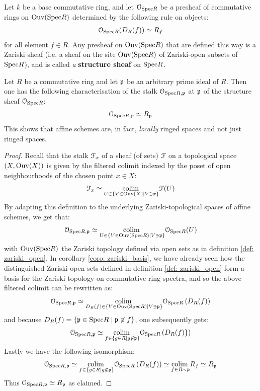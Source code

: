             \begin{proposition} \label{prop: structure_sheaf} 
                Let $k$ be a base commutative ring, and let $\mathcal{O}_{\mathrm{Spec} R}$ be \textit{a} presheaf of commutative rings on $\mathrm{Ouv}(\mathrm{Spec} R)$ determined by the following rule on objects:
                    $$\mathcal{O}_{\mathrm{Spec} R}(D_R(f)) \simeq R_f$$
                for all element $f \in R$. Any presheaf on $\mathrm{Ouv}(\mathrm{Spec} R)$ that are defined this way is a Zariski sheaf (i.e. a sheaf on the site $\mathrm{Ouv}(\mathrm{Spec} R)$ of Zariski-open subsets of $\mathrm{Spec} R$), and is called \textit{a} \textbf{structure sheaf} on $\mathrm{Spec} R$.
            \end{proposition}
            \begin{corollary} \label{coro: structure_sheaf_properties}
                Let $R$ be a commutative ring and let $\mathfrak{p}$ be an arbitrary prime ideal of $R$. Then one has the following characterisation of the stalk $\mathcal{O}_{\mathrm{Spec} R, \mathfrak{p}}$ at $\mathfrak{p}$ of the structure sheaf $\mathcal{O}_{\mathrm{Spec} R}$:
                    $$\mathcal{O}_{\mathrm{Spec} R, \mathfrak{p}} \simeq R_{\mathfrak{p}}$$
                This shows that affine schemes are, in fact, \textit{locally} ringed spaces and not just ringed spaces. 
            \end{corollary} 
                \begin{proof}
                    Recall that the stalk $\mathcal{F}_x$ of a sheaf (of sets) $\mathcal{F}$ on a topological space $(X, \mathrm{Ouv}(X))$ is given by the filtered colimit indexed by the poset of open neighbourhoods of the chosen point $x \in X$:
                        $$\mathcal{F}_x \simeq \underset{U \in \{V \in \mathrm{Ouv}(X) \mid V \ni x\}}{\operatorname{colim} \:} \mathcal{F}(U)$$
                    By adapting this definition to the underlying Zariski-topological spaces of affine schemes, we get that:
                        $$\mathcal{O}_{\mathrm{Spec} R, \mathfrak{p}} \simeq \underset{U \in \{V \in \mathrm{Ouv}(\mathrm{Spec} R) \mid V \ni \mathfrak{p}\}}{\operatorname{colim} \:} \mathcal{O}_{\mathrm{Spec} R}(U)$$
                    with $\mathrm{Ouv}(\mathrm{Spec} R)$ the Zariski topology defined via open sets as in definition \ref{def: zariski_open}. In corollary \ref{coro: zariski_basis}, we have already seen how the distinguished Zariski-open sets defined in definition \ref{def: zariski_open} form a basis for the Zariski topology on commutative ring spectra, and so the above filtered colimit can be rewritten as:
                        $$\mathcal{O}_{\mathrm{Spec} R, \mathfrak{p}} \simeq \underset{D_R(f) \in \{V \in \mathrm{Ouv}(\mathrm{Spec} R) \mid V \ni \mathfrak{p}\}}{\operatorname{colim} \:} \mathcal{O}_{\mathrm{Spec} R}\left(D_R(f)\right)$$
                    and because $D_R(f) = \{\mathfrak{p} \in \mathrm{Spec} R \mid \mathfrak{p} \not \ni f\}$, one subsequently gets:
                        $$\mathcal{O}_{\mathrm{Spec} R, \mathfrak{p}} \simeq \underset{f \in \{g \in R \mid g \not \in \mathfrak{p}\}}{\operatorname{colim} \:} \mathcal{O}_{\mathrm{Spec} R}\left(D_R(f)\}\right)$$
                    Lastly we have the following isomorphism:
                        $$\mathcal{O}_{\mathrm{Spec} R, \mathfrak{p}} \simeq \underset{f \in \{g \in R \mid g \not \in \mathfrak{p}\}}{\operatorname{colim} \:} \mathcal{O}_{\mathrm{Spec} R}\left(D_R(f)\right) \simeq \underset{f \in R \smallsetminus \mathfrak{p}}{\operatorname{colim} \:} R_f \simeq R_{\mathfrak{p}}$$
                    Thus $\mathcal{O}_{\mathrm{Spec} R, \mathfrak{p}} \simeq R_{\mathfrak{p}}$ as claimed.
                \end{proof}
                
